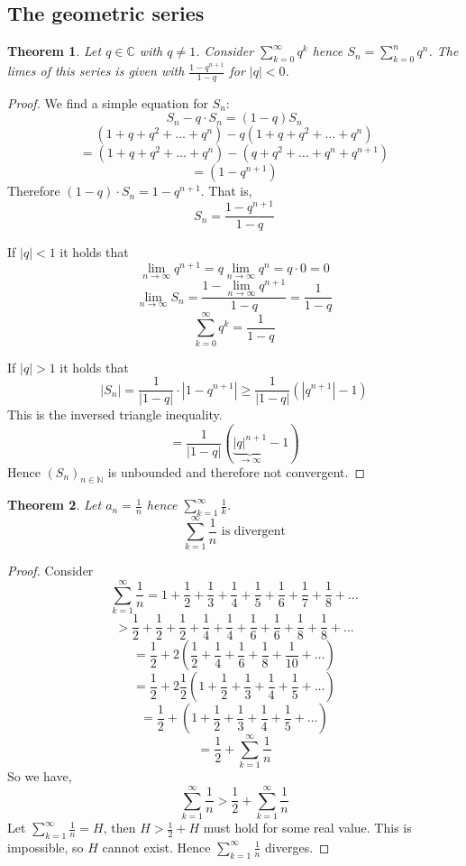 \documentclass[a4paper,landscape,twocolumn]{article}
\newtheorem{theorem}{Theorem}
\newcommand\abs[1]{\left|#1\right|}
\newcommand\seq[1]{{\left(#1\right)}_{n \in \mathbb N}}
\begin{document}
\subsection{The geometric series}
\begin{theorem}
  Let $q \in \mathbb C$ with $q \neq 1$.
  Consider $\sum_{k=0}^\infty q^k$ hence $S_n = \sum_{k=0}^{n} q^n$.
  The limes of this series is given with $\frac{1 - q^{n+1}}{1 - q}$ for $\abs{q} < 0$.
\end{theorem}
\begin{proof}
  We find a simple equation for $S_n$:
  \[ S_n - q \cdot S_n = (1 - q) S_n \]
  \[ (1 + q + q^2 + \dots + q^n) - q (1 + q + q^2 + \dots + q^n) \]
  \[ = (1 + q + q^2 + \dots + q^n) - (q + q^2 + \dots + q^n + q^{n+1}) \]
  \[ = (1 - q^{n+1}) \]
  Therefore $(1 - q) \cdot S_n = 1 - q^{n+1}$. That is,
  \[ S_n = \frac{1 - q^{n+1}}{1 - q} \]

  If $\abs{q} < 1$ it holds that
  \[ \lim_{n\to\infty} q^{n+1} = q \lim_{n\to\infty} q^n = q \cdot 0 = 0 \]
  \[ \lim_{n\to\infty} S_n = \frac{1 - \lim_{n\to\infty} q^{n+1}}{1 - q} = \frac{1}{1 - q} \]
  \[ \sum_{k=0}^\infty q^k = \frac{1}{1 - q} \]

  If $\abs{q} > 1$ it holds that
  \[
    \abs{S_n}
    = \frac{1}{\abs{1 - q}} \cdot \abs{1 - q^{n+1}}
    \geq \frac{1}{\abs{1 - q}} \left(\abs{q^{n+1}} - 1\right)
  \]
  This is the inversed triangle inequality.
  \[ = \frac{1}{\abs{1 - q}} \left(\underbrace{\abs{q}^{n+1}}_{\to\infty} - 1\right) \]
  Hence $\seq{S_n}$ is unbounded and therefore not convergent.
\end{proof}

\begin{theorem}
  Let $a_n = \frac1n$ hence $\sum_{k=1}^\infty \frac1k$.
  \[ \sum_{k=1}^\infty \frac1n \text{ is divergent} \]
\end{theorem}
\begin{proof}
  Consider
  \[ \sum_{k=1}^\infty \frac1n = 1 + \frac12 + \frac13 + \frac14 + \frac15 + \frac16 + \frac17 + \frac18 + \dots \]
  \[ > \frac12 + \frac12 + \frac12 + \frac14 + \frac14 + \frac16 + \frac16 + \frac18 + \frac18 + \dots \]
  \[ = \frac12 + 2 \left(\frac12 + \frac14 + \frac16 + \frac18 + \frac1{10} + \dots\right) \]
  \[ = \frac12 + 2 \frac12 \left(1 + \frac12 + \frac13 + \frac14 + \frac15 + \dots\right) \]
  \[ = \frac12 + \left(1 + \frac12 + \frac13 + \frac14 + \frac15 + \dots\right) \]
  \[ = \frac12 + \sum_{k=1}^\infty \frac1n \]
  So we have,
  \[ \sum_{k=1}^\infty \frac1n > \frac12 + \sum_{k=1}^\infty \frac1n \]
  Let $\sum_{k=1}^\infty \frac1n = H$, then $H > \frac12 + H$ must hold for some real value.
  This is impossible, so $H$ cannot exist. Hence $\sum_{k=1}^\infty \frac1n$ diverges.
\end{proof}
\end{document}
